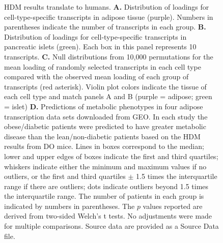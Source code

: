 \documentclass[
]{article}
\begin{document}
\begin{figure}[ht!]
\caption{HDM results translate to humans. \textbf{A.} Distribution of 
loadings for cell-type-specific transcripts in adipose tissue
(purple). Numbers in parentheses indicate the number of 
transcripts in each group. \textbf{B.} Distribution of loadings 
for cell-type-specific transcripts in pancreatic islets (green). 
Each box in this panel represents 10 transcripts. \textbf{C.} 
Null distributions from 10,000 permutations for the mean 
loading of randomly selected transcripts in each cell type 
compared with the observed mean loading of each group 
of transcripts (red asterisk). Violin plot colors indicate the 
tissue of each cell type and match panels A and B 
(purple = adipose; green = islet) \textbf{D.} Predictions of 
metabolic phenotypes in four adipose transcription data 
sets downloaded from GEO. In each study the obese/diabetic 
patients were predicted to have greater metabolic disease 
than the lean/non-diabetic patients based on the HDM 
results from DO mice. Lines in boxes correspond to the 
median; lower and upper edges of boxes indicate the 
first and third quartiles; whiskers indicate either the minimum
and maximum values if no outliers, or the first and third quartiles 
$\pm$ 1.5 times the interquartile range if there are outliers; 
dots indicate outliers beyond 1.5 times the interquartile range. 
The number of patients in each group is indicated by numbers 
in parentheses. The $p$ values reported are derived from two-sided
Welch's t tests. No adjustments were made for multiple comparisons. 
Source data are provided as a Source Data file.
}
\label{fig:human_translation}
\end{figure}
\end{document}
